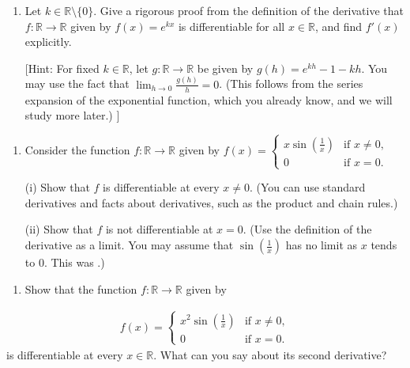 \documentclass[letterpaper,10pt,english]{jupyterBook}
\begin{document}
\label{\detokenize{Problems:id40}}\begin{enumerate}
%
\setcounter{enumi}{39}
\item {} 
\sphinxAtStartPar
Let \(k\in \mathbb{R}\setminus\{0\}\). Give a rigorous proof from the definition of the derivative that  \(f:\mathbb{R}\to \mathbb{R}\) given by  \(f(x) = e^{kx}\) is differentiable for all \(x \in \mathbb{R}\), and find \(f'(x)\) explicitly.

{[}Hint: For fixed \(k\in \mathbb{R}\), let \(g:\mathbb{R}\to\mathbb{R}\) be given by \(g(h)=e^{kh} - 1 - kh \).
You may use the fact that  \(\displaystyle\lim_{h \rightarrow 0}\frac{g(h)}{h} = 0\). (This follows from the series expansion of the exponential function, which you already know, and we will study more later.) {]}

\end{enumerate}
\label{\detokenize{Problems:id41}}\begin{enumerate}
%
\setcounter{enumi}{40}
\item {} 
\sphinxAtStartPar
Consider the function  \(f:\mathbb{R}\to \mathbb{R}\) given by \(f(x) = \begin{cases} x\sin\left(\frac{1}{x}\right) & \text{if }x \neq 0,\\ 0 & \text{if }x = 0.\end{cases}\)

\sphinxAtStartPar
(i) Show that \(f\) is differentiable at every \(x \neq 0\). (You can use standard derivatives and facts about derivatives, such as the product and chain rules.)

\sphinxAtStartPar
(ii) Show that \(f\) is not differentiable at \(x = 0\). (Use the definition of the derivative as a limit. You may assume that \(\sin\left(\frac{1}{x}\right)\) has no limit as \(x\) tends to \(0\). This was {\hyperref[\detokenize{Problems:id8}]{}}.)

\end{enumerate}
\label{\detokenize{Problems:id42}}\begin{enumerate}
%
\setcounter{enumi}{41}
\item {} 
\sphinxAtStartPar
Show that the function  \(f:\mathbb{R}\to \mathbb{R}\) given by

\end{enumerate}
\begin{equation*}
\begin{split}
f(x) = \begin{cases} x^2\sin\left(\frac{1}{x}\right) & \text{if }x \neq 0,\\ 0 & \text{if }x = 0.\end{cases}
\end{split}
\end{equation*}
\sphinxAtStartPar
is differentiable at every \(x \in \mathbb{R}\). What can you say about its second derivative?
\end{document}
